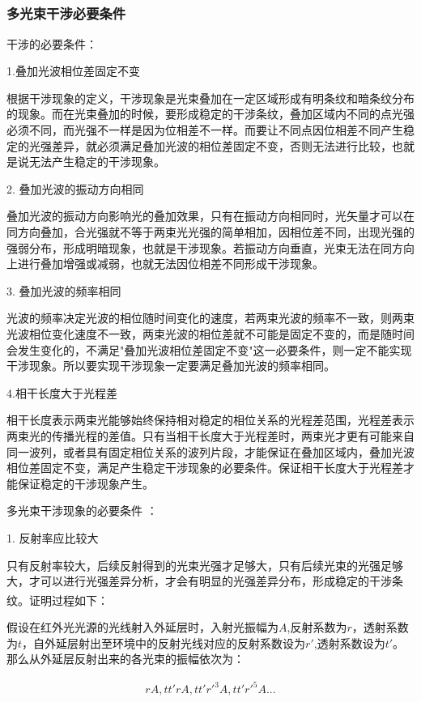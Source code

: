 \documentclass[UTF8]{ctexart}
\begin{document}
\subsubsection{多光束干涉必要条件\textsuperscript{\cite{7}}}
干涉的必要条件：\par 
1.叠加光波相位差固定不变\par 
根据干涉现象的定义，干涉现象是光束叠加在一定区域形成有明条纹和暗条纹分布的现象。而在光束叠加的时候，要形成稳定的干涉条纹，叠加区域内不同的点光强必须不同，而光强不一样是因为位相差不一样。而要让不同点因位相差不同产生稳定的光强差异，就必须满足叠加光波的相位差固定不变，否则无法进行比较，也就是说无法产生稳定的干涉现象。\par 
2.	叠加光波的振动方向相同\par 
叠加光波的振动方向影响光的叠加效果，只有在振动方向相同时，光矢量才可以在同方向叠加，合光强就不等于两束光光强的简单相加，因相位差不同，出现光强的强弱分布，形成明暗现象，也就是干涉现象。若振动方向垂直，光束无法在同方向上进行叠加增强或减弱，也就无法因位相差不同形成干涉现象。\par 
3.	叠加光波的频率相同\par 
光波的频率决定光波的相位随时间变化的速度，若两束光波的频率不一致，则两束光波相位变化速度不一致，两束光波的相位差就不可能是固定不变的，而是随时间会发生变化的，不满足"叠加光波相位差固定不变"这一必要条件，则一定不能实现干涉现象。所以要实现干涉现象一定要满足叠加光波的频率相同。\par 
4.相干长度大于光程差\par 
相干长度表示两束光能够始终保持相对稳定的相位关系的光程差范围，光程差表示两束光的传播光程的差值。只有当相干长度大于光程差时，两束光才更有可能来自同一波列，或者具有固定相位关系的波列片段，才能保证在叠加区域内，叠加光波相位差固定不变，满足产生稳定干涉现象的必要条件。保证相干长度大于光程差才能保证稳定的干涉现象产生。\par
多光束干涉现象的必要条件 ：\par 
1.	反射率应比较大\par 
只有反射率较大，后续反射得到的光束光强才足够大，只有后续光束的光强足够大，才可以进行光强差异分析，才会有明显的光强差异分布，形成稳定的干涉条纹。证明过程如下\textsuperscript{\cite{7}}：\par 
假设在红外光光源的光线射入外延层时，入射光振幅为$A$,反射系数为$r$，透射系数为$t$，自外延层射出至环境中的反射光线对应的反射系数设为$r'$,透射系数设为$t'$。那么从外延层反射出来的各光束的振幅依次为：\par 
\begin{align}
	rA,tt'rA,tt'r'^3A,tt'r'^5A...
	\label{e3}
\end{align}\par 
\end{document}
